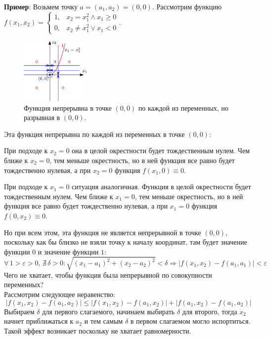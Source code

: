 \documentclass[12pt]{article}
\newcommand{\VE}{\varepsilon}
\theoremstyle{definition}
\begin{document}
\textbf{Пример}: Возьмем точку $a = (a_1, a_2) = (0,0)$. Рассмотрим функцию $f(x_1,x_2) = \begin{cases} 1, & x_2 = x_1^2 \wedge x_1 \geq 0 \\ 0, & x_2 \neq x_1^2 \vee x_1 < 0 \end{cases}$.
\begin{figure}[H]
	\centering
	\includegraphics[width=0.3\textwidth]{10_2.eps}
	\caption{Функция непрерывна в точке $(0,0)$ по каждой из переменных, но разрывная в $(0,0)$.}
	\label{10_2}
\end{figure}
Эта функция непрерывна по каждой из переменных в точке $(0,0)$: 

При подходе к $x_2 = 0$ она в целой окрестности будет тождественным нулем. Чем ближе к $x_2 = 0$, тем меньше окрестность, но в ней функция все равно будет тождественно нулевая, а при $x_2 = 0$ функция $f(x_1,0) \equiv 0$.

При подходе к $x_1 = 0$ ситуация аналогичная. Функция в целой окрестности будет тождественным нулем. Чем ближе к $x_1 = 0$, тем меньше окрестность, но в ней функция все равно будет тождественно нулевая, а при $x_1 = 0$ функция $f(0,x_2) \equiv 0$.

Но при всем этом, эта функция не является непрерывной в точке $(0,0)$, поскольку как бы близко не взяли точку к началу координат, там будет значение функции $0$ и значение функции $1$:
$$
	\forall\, 1 > \VE > 0, \, \nexists \, \delta > 0 \colon \sqrt{(x_1 - a_1)^2 + (x_2 - a_2)^2} < \delta \Rightarrow |f(x_1,x_2) - f(a_1,a_1) | < \VE
$$
Чего не хватает, чтобы функция была непрерывной по совокупности переменных? \\
Рассмотрим следующее неравенство:
$$
	|f(x_1,x_2) - f(a_1,a_2)|\leq |f(x_1,x_2) - f(a_1, x_2)| + |f(a_1,x_2) - f(a_1,a_2)|
$$
Выбираем $\delta$ для первого слагаемого, начинаем выбирать $\delta$ для второго, тогда $x_2$ начнет приближаться к $a_2$ и тем самым $\delta$ в первом слагаемом могло испортиться. Такой эффект возникает поскольку не хватает равномерности.
\end{document}

